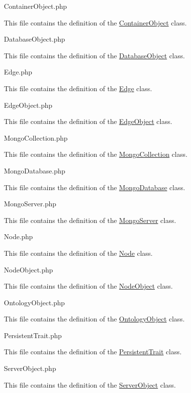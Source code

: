 Container\-Object.\-php

This file contains the definition of the \hyperlink{class_ontology_wrapper_1_1_container_object}{Container\-Object} class.

Database\-Object.\-php

This file contains the definition of the \hyperlink{class_ontology_wrapper_1_1_database_object}{Database\-Object} class.

Edge.\-php

This file contains the definition of the \hyperlink{class_ontology_wrapper_1_1_edge}{Edge} class.

Edge\-Object.\-php

This file contains the definition of the \hyperlink{class_ontology_wrapper_1_1_edge_object}{Edge\-Object} class.

Mongo\-Collection.\-php

This file contains the definition of the \hyperlink{class_ontology_wrapper_1_1_mongo_collection}{Mongo\-Collection} class.

Mongo\-Database.\-php

This file contains the definition of the \hyperlink{class_ontology_wrapper_1_1_mongo_database}{Mongo\-Database} class.

Mongo\-Server.\-php

This file contains the definition of the \hyperlink{class_ontology_wrapper_1_1_mongo_server}{Mongo\-Server} class.

Node.\-php

This file contains the definition of the \hyperlink{class_ontology_wrapper_1_1_node}{Node} class.

Node\-Object.\-php

This file contains the definition of the \hyperlink{class_ontology_wrapper_1_1_node_object}{Node\-Object} class.

Ontology\-Object.\-php

This file contains the definition of the \hyperlink{class_ontology_wrapper_1_1_ontology_object}{Ontology\-Object} class.

Persistent\-Trait.\-php

This file contains the definition of the \hyperlink{namespace_ontology_wrapper_aad152394da45245f97951e27b3e564ca}{Persistent\-Trait} class.

Server\-Object.\-php

This file contains the definition of the \hyperlink{class_ontology_wrapper_1_1_server_object}{Server\-Object} class.

